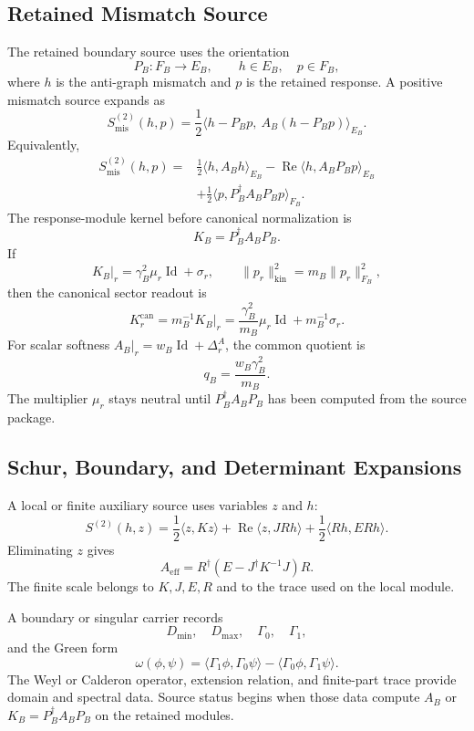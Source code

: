 \documentclass[11pt]{article}
\newcommand{\Id}{\operatorname{Id}}
\begin{document}
\subsection{Retained Mismatch Source}

The retained boundary source uses the orientation
\[
  P_B:F_B\longrightarrow E_B,\qquad
  h\in E_B,\quad p\in F_B,
\]
where \(h\) is the anti-graph mismatch and \(p\) is the retained response.
A positive mismatch source expands as
\[
  S_{\mathrm{mis}}^{(2)}(h,p)
  =\frac12
    \langle h-P_Bp,\ A_B(h-P_Bp)\rangle_{E_B}.
\]
Equivalently,
\[
\begin{aligned}
  S_{\mathrm{mis}}^{(2)}(h,p)
   ={}&\frac12\langle h,A_Bh\rangle_{E_B}
       -\operatorname{Re}\langle h,A_BP_Bp\rangle_{E_B}  \\
     &+\frac12
       \langle p,P_B^\dagger A_BP_Bp\rangle_{F_B}.
\end{aligned}
\]
The response-module kernel before canonical normalization is
\[
  K_B=P_B^\dagger A_BP_B .
\]
If
\[
  K_B\vert_r=\gamma_B^2\mu_r\Id+\sigma_r,
  \qquad
  \|p_r\|_{\mathrm{kin}}^2=m_B\|p_r\|_{F_B}^2,
\]
then the canonical sector readout is
\[
  K_r^{\mathrm{can}}
    =m_B^{-1}K_B\vert_r
    =\frac{\gamma_B^2}{m_B}\mu_r\Id
      +m_B^{-1}\sigma_r .
\]
For scalar softness \(A_B\vert_r=w_B\Id+\Delta_r^A\), the common quotient is
\[
  q_B=\frac{w_B\gamma_B^2}{m_B}.
\]
The multiplier \(\mu_r\) stays neutral until \(P_B^\dagger A_BP_B\) has
been computed from the source package.

\subsection{Schur, Boundary, and Determinant Expansions}

A local or finite auxiliary source uses variables \(z\) and \(h\):
\[
  S^{(2)}(h,z)
    =\frac12\langle z,Kz\rangle
     +\operatorname{Re}\langle z,JR h\rangle
     +\frac12\langle Rh,ERh\rangle .
\]
Eliminating \(z\) gives
\[
  A_{\mathrm{eff}}
    =R^\dagger(E-J^\dagger K^{-1}J)R.
\]
The finite scale belongs to \(K,J,E,R\) and to the trace used on the local
module.

A boundary or singular carrier records
\[
  D_{\min},\quad D_{\max},\quad
  \Gamma_0,\quad \Gamma_1,
\]
and the Green form
\[
  \omega(\phi,\psi)
  =\langle\Gamma_1\phi,\Gamma_0\psi\rangle
   -\langle\Gamma_0\phi,\Gamma_1\psi\rangle .
\]
The Weyl or Calderon operator, extension relation, and finite-part trace
provide domain and spectral data.  Source status begins when those data
compute \(A_B\) or \(K_B=P_B^\dagger A_BP_B\) on the retained modules.
\end{document}
